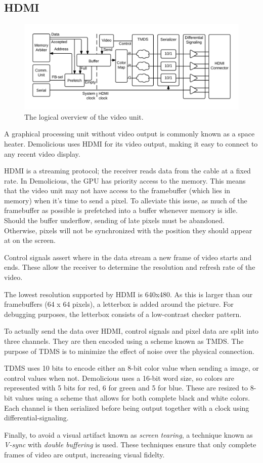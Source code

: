 \documentclass[../main/report.tex]{subfiles}
\begin{document}
\subsection{HDMI}
\begin{figure}
	\centering
	\includegraphics[width=\textwidth]{diagrams/HDMI_overview.png}
	\caption{The logical overview of the video unit.}
	\label{fig:video_unit}
\end{figure}
A graphical processing unit without video output is commonly known as a space heater.
Demolicious uses HDMI for its video output, making it easy to connect to any recent video display.

HDMI is a streaming protocol; the receiver reads data from the cable at a fixed rate.
In Demolicious, the GPU has priority access to the memory.
This means that the video unit may not have access to the framebuffer (which lies in memory) when it's time to send a pixel.
To alleviate this issue, as much of the framebuffer as possible is prefetched into a buffer whenever memory is idle.
Should the buffer underflow, sending of late pixels must be abandoned.
Otherwise, pixels will not be synchronized with the position they should appear at on the screen.

Control signals assert where in the data stream a new frame of video starts and ends.
These allow the receiver to determine the resolution and refresh rate of the video.

The lowest resolution supported by HDMI is 640x480.
As this is larger than our framebuffers (64 x 64 pixels), a letterbox is added around the picture.
For debugging purposes, the letterbox consists of a low-contrast checker pattern.

To actually send the data over HDMI, control signals and pixel data are split into three channels.
They are then encoded using a scheme known as TMDS.
The purpose of TDMS is to minimize the effect of noise over the physical connection.

TDMS uses 10 bits to encode either an 8-bit color value when sending a image, or control values when not.
Demolicious uses a 16-bit word size, so colors are represented with 5 bits for red, 6 for green and 5 for blue.
These are resized to 8-bit values using a scheme that allows for both complete black and white colors.
Each channel is then serialized before being output together with a clock using differential-signaling.

Finally, to avoid a visual artifact known as \emph{screen tearing}, a technique known as \emph{V-sync} with \emph{double buffering} is used.
These techniques ensure that only complete frames of video are output, increasing visual fidelty.
\end{document}
